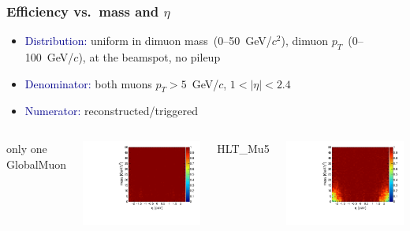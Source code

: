 \documentclass[compress]{beamer}
\begin{document}
\begin{frame}
\frametitle{Efficiency vs.\ mass and $\eta$}
\begin{itemize}
\item \textcolor{darkblue}{Distribution:} uniform in dimuon mass~(0--50~GeV/$c^2$), dimuon $p_T$~(0--100~GeV/$c$), at the beamspot, no pileup

\item \textcolor{darkblue}{Denominator:} both muons $p_T > 5$~GeV/$c$, $1 < |\eta| < 2.4$

\item \textcolor{darkblue}{Numerator:} reconstructed/triggered
\end{itemize}

\vfill
\begin{columns}
\centering only one GlobalMuon

\includegraphics[width=\linewidth]{masseta_oneGlobalMuon.pdf}

\centering HLT\_Mu5

\includegraphics[width=\linewidth]{masseta_Mu5.pdf}


\end{columns}
\end{frame}
\end{document}

